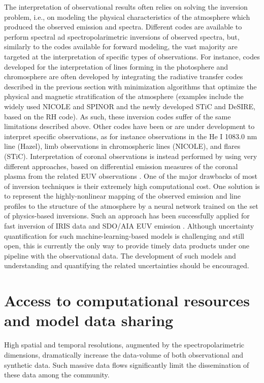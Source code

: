 \documentclass[]{article}
\begin{document}
The interpretation of observational results often relies on solving the inversion problem, i.e., on modeling the physical characteristics of the atmosphere which produced the observed emission and spectra. 
Different codes are available to perform spectral ad spectropolarimetric inversions of observed spectra, but, similarly to the codes available for forward modeling, the vast majority are targeted at the interpretation of specific types of observations. For instance, codes developed for the interpretation of lines forming in the photosphere and chromosphere are often developed by integrating the radiative transfer codes described in the previous section with minimization algorithms that optimize the physical and magnetic stratification of the atmosphere (examples include the widely used NICOLE and SPINOR and the newly developed STiC and DeSIRE, based on the RH code). As such, these inversion codes suffer of the same limitations described above. Other codes have been or are under development to interpret specific observations, as for instance observations in the He I  1083.0 nm line (Hazel), limb observations in chromospheric lines (NICOLE), and flares (STiC). Interpretation of coronal observations is instead performed by using very different approaches, based on differential emission measures of the coronal plasma from the related EUV observations \citep[e.g.,][]{Cheung2015}. One of the major drawbacks of most of inversion techniques is their extremely high computational cost.  
One solution is to represent the highly-nonlinear mapping of the observed emission and line profiles to the structure of the atmosphere by a neural network trained on the set of physics-based inversions. Such an approach has been successfully applied for fast inversion of IRIS data \citep{SainzDalda2019} and SDO/AIA EUV emission \citep{Wright2019}. Although uncertainty quantification for such machine-learning-based models is challenging and still open, this is currently the only way to provide timely data products under one pipeline with the observational data. The development of such models and understanding and quantifying the related uncertainties should be encouraged.


\section{Access to computational resources and model data sharing}
 High spatial and temporal resolutions, augmented by the spectropolarimetric dimensions, dramatically increase the data-volume of both observational and synthetic data. Such massive data flows significantly limit the dissemination of these data among the community. 
\end{document}
